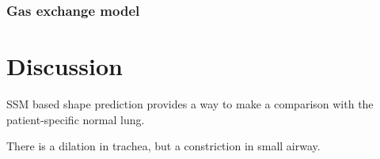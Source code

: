 \subsubsection{Gas exchange model}

\section{Discussion}
SSM based shape prediction provides a way to make a comparison with the patient-specific normal lung. 

There is a dilation in trachea, but a constriction in small airway.
